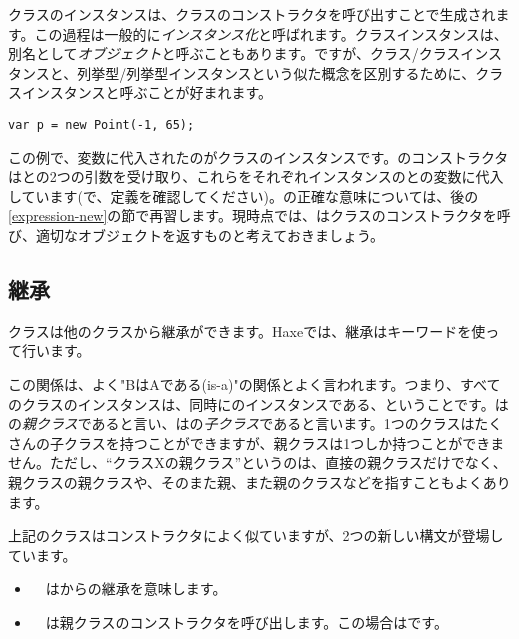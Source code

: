 クラスのインスタンスは、クラスのコンストラクタを呼び出すことで生成されます。この過程は一般的に\emph{インスタンス化}と呼ばれます。クラスインスタンスは、別名として\emph{オブジェクト}と呼ぶこともあります。ですが、クラス/クラスインスタンスと、列挙型/列挙型インスタンスという似た概念を区別するために、クラスインスタンスと呼ぶことが好まれます。

\begin{lstlisting}
var p = new Point(-1, 65);
\end{lstlisting}

この例で、変数に代入されたのがクラスのインスタンスです。のコンストラクタはとの2つの引数を受け取り、これらをそれぞれインスタンスのとの変数に代入しています(で、定義を確認してください)。の正確な意味については、後の\ref{expression-new}の節で再習します。現時点では、はクラスのコンストラクタを呼び、適切なオブジェクトを返すものと考えておきましょう。


\subsection{継承}
\label{types-class-inheritance}

クラスは他のクラスから継承ができます。Haxeでは、継承はキーワードを使って行います。


この関係は、よく"BはAである(is-a)"の関係とよく言われます。つまり、すべてのクラスのインスタンスは、同時にのインスタンスである、ということです。はの\emph{親クラス}であると言い、はの\emph{子クラス}であると言います。1つのクラスはたくさんの子クラスを持つことができますが、親クラスは1つしか持つことができません。ただし、``クラスXの親クラス''というのは、直接の親クラスだけでなく、親クラスの親クラスや、そのまた親、また親のクラスなどを指すこともよくあります。

上記のクラスはコンストラクタによく似ていますが、2つの新しい構文が登場しています。

\begin{itemize}
	\item {}　はからの継承を意味します。
	\item {}　は親クラスのコンストラクタを呼び出します。この場合はです。
\end{itemize}

